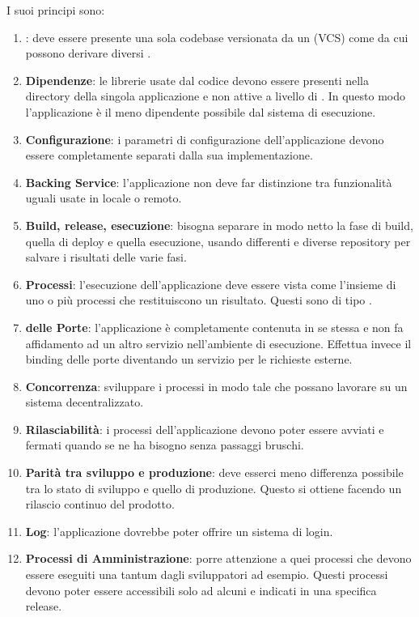 		I suoi principi sono:
		
		\begin{enumerate}
			\item \textbf{}: deve essere presente una sola codebase versionata da un  (VCS) come  da cui
			possono derivare diversi .
			\item \textbf{Dipendenze}: le librerie usate dal codice devono essere presenti nella directory della singola applicazione e non attive a livello di . In questo modo l'applicazione è il meno dipendente possibile dal sistema di esecuzione.
			\item \textbf{Configurazione}: i parametri di configurazione dell'applicazione devono essere completamente separati dalla sua implementazione.
			\item \textbf{Backing Service}: l'applicazione non deve far distinzione tra funzionalità uguali usate in locale o remoto.
			\item \textbf{Build, release, esecuzione}: bisogna separare in modo netto la fase di build, quella di deploy e quella esecuzione, usando  differenti e diverse repository per salvare i risultati delle varie fasi.
			\item \textbf{Processi}: l'esecuzione dell'applicazione deve essere vista come l'insieme di uno o più processi che restituiscono un risultato. Questi sono di tipo .
			\item \textbf{ delle Porte}: l'applicazione è completamente contenuta in se stessa e non fa affidamento ad un altro servizio nell'ambiente di esecuzione. Effettua invece il binding delle porte diventando un servizio per le richieste esterne.
			\item \textbf{Concorrenza}: sviluppare i processi in modo tale che possano lavorare su un sistema decentralizzato.
			\item \textbf{Rilasciabilità}: i processi dell'applicazione devono poter essere avviati e fermati quando se ne ha bisogno senza passaggi bruschi.
			\item \textbf{Parità tra sviluppo e produzione}: deve esserci meno differenza possibile tra lo stato di sviluppo e quello di produzione. Questo si ottiene facendo un rilascio continuo del prodotto.
			\item \textbf{Log}: l'applicazione dovrebbe poter offrire un sistema di login.
			\item \textbf{Processi di Amministrazione}: porre attenzione a quei processi che devono essere eseguiti una tantum dagli sviluppatori ad esempio. Questi processi devono poter essere accessibili solo ad alcuni e indicati in una specifica release.
		\end{enumerate}
		

